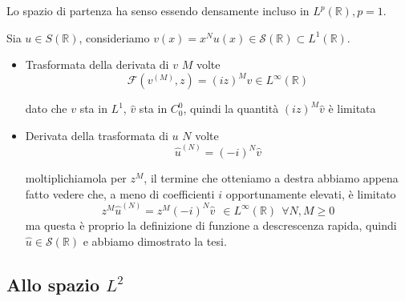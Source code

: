 \documentclass[10pt,a4paper,twoside]{book}
\begin{document}
Lo spazio di partenza ha senso essendo densamente incluso in $L^{p}(\mathbb{R}) ,p=1$.

Sia $u\in S(\mathbb{R})$, consideriamo $v( x) =x^{N} u( x) \in \mathcal{S}(\mathbb{R}) \subset L^{1}(\mathbb{R})$.
\begin{itemize}
\item Trasformata della derivata di $v$ $M$ volte\begin{equation*}
\mathcal{F}\left( v^{( M)} ,z\right) =( iz)^{M}\hat{v} \in L^{\infty }(\mathbb{R})
\end{equation*}

dato che $v$ sta in $L^{1}$, $\hat{v}$ sta in $C^{0}_{0}$, quindi la quantità $( iz)^{M}\hat{v}$ è limitata
\item Derivata della trasformata di $u$ $N$ volte\begin{equation*}
\hat{u}^{( N)} =( -i)^{N}\hat{v}
\end{equation*}

moltiplichiamola per $z^{M}$, il termine che otteniamo a destra abbiamo appena fatto vedere che, a meno di coefficienti $i$ opportunamente elevati, è limitato\begin{equation*}
z^{M}\hat{u}^{( N)} =z^{M}( -i)^{N}\hat{v} \ \ \boxed{\in L^{\infty }(\mathbb{R})} \ \ \forall N,M\geqslant 0
\end{equation*}ma questa è proprio la definizione di funzione a descrescenza rapida, quindi $\hat{u} \in \mathcal{S}(\mathbb{R})$ e abbiamo dimostrato la tesi.\begin{equation*}
\end{equation*}
\end{itemize}
\subsection{Allo spazio $L^{2}$}
\end{document}
